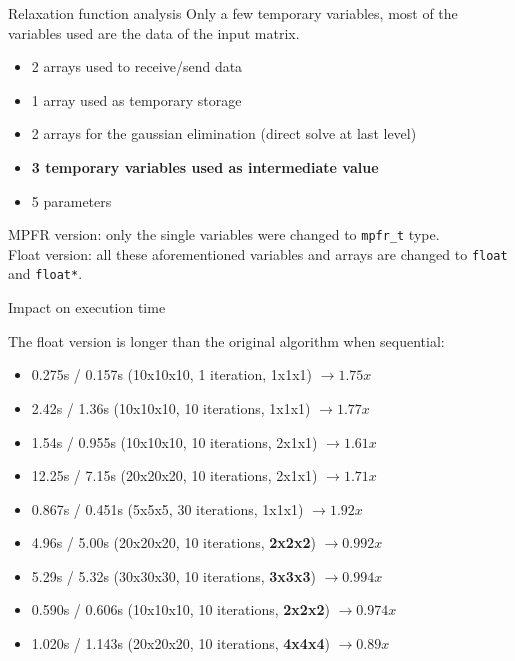 \documentclass{beamer}
\begin{document}
\begin{frame}{Relaxation function analysis}
  Only a few temporary variables, most of the variables used are the data of the input matrix.
  \begin{itemize}
    \item 2 arrays used to receive/send data
    \item 1 array used as temporary storage
    \item 2 arrays for the gaussian elimination (direct solve at last level)
    \item \textbf{3 temporary variables used as intermediate value}
    \item 5 parameters
   \end{itemize}
   MPFR version: only the single variables were changed to \texttt{mpfr\_t} type.\\
   Float version: all these aforementioned variables and arrays are changed to \texttt{float} and \texttt{float*}.
\end{frame}

\begin{frame}{Impact on execution time}
 
 The float version is longer than the original algorithm when sequential:\\
 \begin{itemize}
  \item 0.275s / 0.157s (10x10x10, 1 iteration, 1x1x1) $\rightarrow 1.75x$
  \item 2.42s / 1.36s (10x10x10, 10 iterations, 1x1x1) $\rightarrow 1.77x$
  \item 1.54s / 0.955s (10x10x10, 10 iterations, 2x1x1) $\rightarrow 1.61x$
  \item 12.25s / 7.15s (20x20x20, 10 iterations, 2x1x1) $\rightarrow 1.71x$
  \item 0.867s / 0.451s (5x5x5, 30 iterations, 1x1x1) $\rightarrow 1.92x$
  \item 4.96s / 5.00s (20x20x20, 10 iterations, \textbf{2x2x2})  $\rightarrow 0.992x$
  \item 5.29s / 5.32s (30x30x30, 10 iterations, \textbf{3x3x3})  $\rightarrow 0.994x$
  \item 0.590s / 0.606s (10x10x10, 10 iterations, \textbf{2x2x2})  $\rightarrow 0.974x$
  \item 1.020s / 1.143s (20x20x20, 10 iterations, \textbf{4x4x4})  $\rightarrow 0.89x$
 \end{itemize}
\end{frame}
\end{document}
